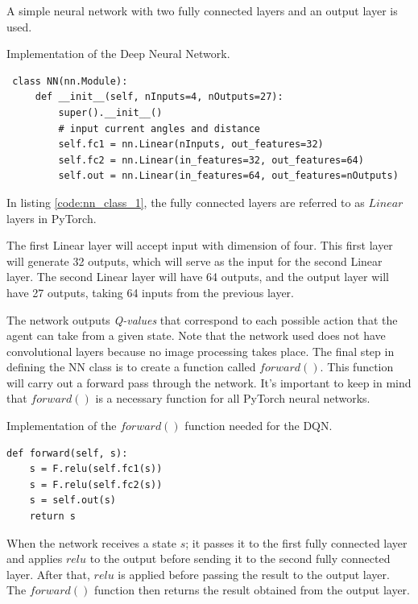 \documentclass[12pt,oneside]{article}
\begin{document}
A simple neural network with two fully connected layers and an output layer is used.
\begin{listing}[htbp]
\caption{Implementation of the Deep Neural Network.}
\label{code:nn_class_1}
\begin{tcolorbox}[]
\begin{verbatim}
 class NN(nn.Module):
     def __init__(self, nInputs=4, nOutputs=27):
         super().__init__()
         # input current angles and distance
         self.fc1 = nn.Linear(nInputs, out_features=32)
         self.fc2 = nn.Linear(in_features=32, out_features=64)
         self.out = nn.Linear(in_features=64, out_features=nOutputs)
\end{verbatim}
\end{tcolorbox}
\end{listing} 

In listing \ref{code:nn_class_1}, the fully connected layers are referred to as $Linear$ layers in PyTorch.

The first Linear layer will accept input with dimension of four. This first layer will generate 32 outputs, which will serve as the input for the second Linear layer. The second Linear layer will have 64 outputs, and the output layer will have 27 outputs, taking 64 inputs from the previous layer.

The network outputs \textit{Q-values} that correspond to each possible action that the agent can take from a given state. Note that the network used does not have convolutional layers because no image processing takes place.
The final step in defining the NN class is to create a function called $forward()$. This function will carry out a forward pass through the network. It's important to keep in mind that $forward()$ is a necessary function for all PyTorch neural networks.

\begin{listing}[htbp]
\caption{Implementation of the $forward()$ function needed for the DQN.}
\label{code:nn_class_2}
\begin{tcolorbox}[]
\begin{verbatim}
def forward(self, s):
    s = F.relu(self.fc1(s))
    s = F.relu(self.fc2(s))
    s = self.out(s)
    return s
\end{verbatim}
\end{tcolorbox}
\end{listing} 
When the network receives a state $s$; it passes it to the first fully connected layer and applies $relu$ to the output before sending it to the second fully connected layer. After that, $relu$ is applied before passing the result to the output layer. The $forward()$ function then returns the result obtained from the output layer.
\end{document}
